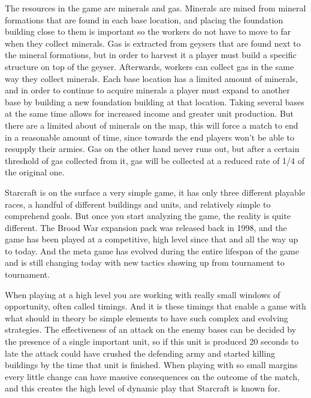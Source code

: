 The resources in the game are minerals and gas. Minerals are mined from mineral
formations that are found in each base location, and placing the foundation
building close to them is important so the workers do not have to move to far
when they collect minerals. Gas is extracted from geysers that are found next to
the mineral formations, but in order to harvest it a player must build a
specific structure on top of the geyser. Afterwards, workers can collect gas in
the same way they collect minerals. Each base location has a limited amount of
minerals, and in order to continue to acquire minerals a player must expand to
another base by building a new foundation building at that location. Taking
several bases at the same time allows for increased income and greater unit
production. But there are a limited about of minerals on the map, this will
force a match to end in a reasonable amount of time, since towards the end
players won't be able to resupply their armies. Gas on the other hand never runs
out, but after a certain threshold of gas collected from it, gas will be
collected at a reduced rate of 1/4 of the original one.

Starcraft is on the surface a very simple game, it has only three different
playable races, a handful of different buildings and units, and relatively
simple to comprehend goals. But once you start analyzing the game, the reality
is quite different. The Brood War expansion pack was released back in 1998, and
the game has been played at a competitive, high level since that and all the way
up to today. And the meta game has evolved during the entire lifespan of the
game and is still changing today with new tactics showing up from tournament to
tournament. \cite{starcraft}

When playing at a high level you are working with really small windows of
opportunity, often called timings. And it is these timings that enable a game
with what should in theory be simple elements to have such complex and evolving
strategies. The effectiveness of an attack on the enemy bases can be decided by
the presence of a single important unit, so if this unit is produced 20 seconds
to late the attack could have crushed the defending army and started killing
buildings by the time that unit is finished. When playing with so small margins
every little change can have massive consequences on the outcome of the match,
and this creates the high level of dynamic play that Starcraft is known for.
 
